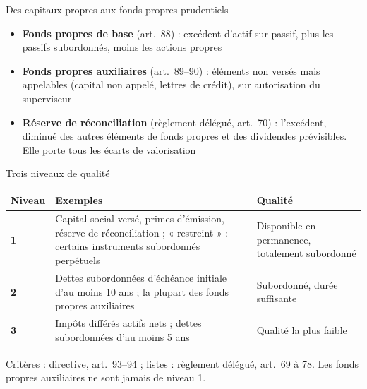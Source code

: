 \documentclass[10pt,aspectratio=169]{beamer}
\begin{document}
\begin{frame}{Des capitaux propres aux fonds propres prudentiels}
\begin{center}
\end{center}
\begin{itemize}
  \item \textbf{Fonds propres de base} (art.~88) : excédent d'actif sur passif, plus les passifs
        subordonnés, moins les actions propres
  \item \textbf{Fonds propres auxiliaires} (art.~89--90) : éléments non versés mais appelables
        (capital non appelé, lettres de crédit), sur autorisation du superviseur
  \item \textbf{Réserve de réconciliation} (règlement délégué, art.~70) : l'excédent, diminué des
        autres éléments de fonds propres et des dividendes prévisibles. Elle porte tous les écarts de valorisation
\end{itemize}
\end{frame}

\begin{frame}{Trois niveaux de qualité}
\begin{table}
\centering
\small
\renewcommand{\arraystretch}{1.4}
\begin{tabular}{p{1.6cm}p{6.2cm}p{5.2cm}}
\toprule
\textbf{Niveau} & \textbf{Exemples} & \textbf{Qualité} \\
\midrule
\textbf{1} & Capital social versé, primes d'émission, réserve de réconciliation ; « restreint » : certains instruments subordonnés perpétuels & Disponible en permanence, totalement subordonné \\
\textbf{2} & Dettes subordonnées d'échéance initiale d'au moins 10 ans ; la plupart des fonds propres auxiliaires & Subordonné, durée suffisante \\
\textbf{3} & Impôts différés actifs nets ; dettes subordonnées d'au moins 5 ans & Qualité la plus faible \\
\bottomrule
\end{tabular}
\end{table}
\small Critères : directive, art.~93--94 ; listes : règlement délégué, art.~69 à 78. Les fonds propres
auxiliaires ne sont jamais de niveau 1.
\end{frame}
\end{document}
